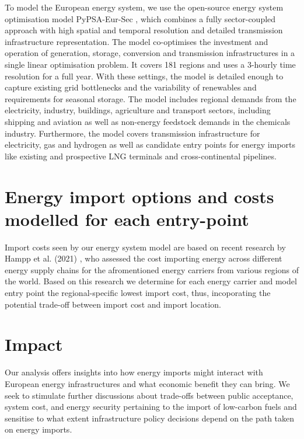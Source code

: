 \documentclass[12pt,3p]{elsarticle}
\begin{document}
To model the European energy system, we use the open-source energy system
optimisation model PyPSA-Eur-Sec \cite{PyPSAEurSecSectorCoupled}, which combines a fully
sector-coupled approach with high spatial and temporal resolution and detailed
transmission infrastructure representation. The model co-optimises the
investment and operation of generation, storage, conversion and transmission
infrastructures in a single linear optimisation problem. It covers 181 regions
and uses a 3-hourly time resolution for a full year. With these settings, the
model is detailed enough to capture existing grid bottlenecks and the
variability of renewables and requirements for seasonal storage. The model
includes regional demands from the electricity, industry, buildings, agriculture
and transport sectors, including shipping and aviation as well as non-energy
feedstock demands in the chemicals industry.  Furthermore, the model covers
transmission infrastructure for electricity, gas and hydrogen as well as
candidate entry points for energy imports like existing and prospective LNG
terminals and cross-continental pipelines.

\section*{Energy import options and costs modelled for each entry-point}

Import costs seen by our energy system model are based on recent research by
Hampp et al. (2021) \cite{hamppImportOptions2021}, who assessed the cost
importing energy across different energy supply chains for the afromentioned
energy carriers from various regions of the world. Based on this research we
determine for each energy carrier and model entry point the regional-specific
lowest import cost, thus, incoporating the potential trade-off between import
cost and import location.

\section*{Impact}

Our analysis offers insights into how energy imports might interact with
European energy infrastructures and what economic benefit they can bring. We
seek to stimulate further discussions about trade-offs between public
acceptance, system cost, and energy security pertaining to the import of
low-carbon fuels and sensitise to what extent infrastructure policy decisions
depend on the path taken on energy imports.
\end{document}
